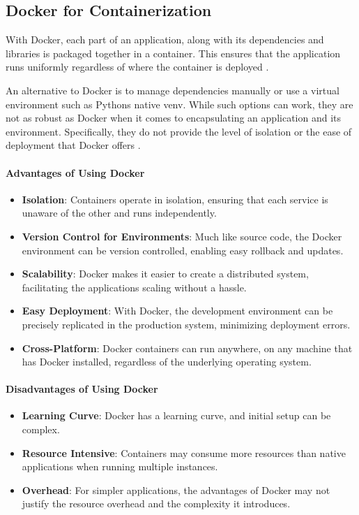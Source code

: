\subsection{Docker for
Containerization}\label{docker-for-containerization}

With Docker, each part of an application, along with its dependencies
and libraries is packaged together in a container. This ensures that the
application runs uniformly regardless of where the container is deployed
\cite{35}.

An alternative to Docker is to manage dependencies manually or use a
virtual environment such as Python\textquotesingle s native venv. While
such options can work, they are not as robust as Docker when it comes to
encapsulating an application and its environment. Specifically, they do
not provide the level of isolation or the ease of deployment that Docker
offers \cite{36}.

\paragraph{Advantages of Using Docker}\label{advantages-of-using-docker}

\begin{itemize}
\item
  \textbf{Isolation}: Containers operate in isolation, ensuring that
  each service is unaware of the other and runs independently.
\item
  \textbf{Version Control for Environments}: Much like source code, the
  Docker environment can be version controlled, enabling easy rollback
  and updates.
\item
  \textbf{Scalability}: Docker makes it easier to create a distributed
  system, facilitating the application\textquotesingle s scaling without
  a hassle.
\item
  \textbf{Easy Deployment}: With Docker, the development environment can
  be precisely replicated in the production system, minimizing
  deployment errors.
\item
  \textbf{Cross-Platform}: Docker containers can run anywhere, on any
  machine that has Docker installed, regardless of the underlying
  operating system.
\end{itemize}

\paragraph{Disadvantages of Using
Docker}\label{disadvantages-of-using-docker}

\begin{itemize}
\item
  \textbf{Learning Curve}: Docker has a learning curve, and initial
  setup can be complex.
\item
  \textbf{Resource Intensive}: Containers may consume more resources
  than native applications when running multiple instances.
\item
  \textbf{Overhead}: For simpler applications, the advantages of Docker
  may not justify the resource overhead and the complexity it
  introduces.
\end{itemize}
